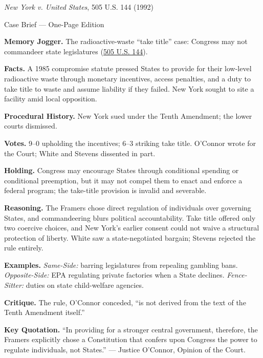 \documentclass[12pt]{article}
\begin{document}
\begin{center}
{\Large \textit{New York v. United States}, 505 U.S. 144 (1992)\par}
\vspace{0.3em}
{\normalsize Case Brief --- One-Page Edition\par}
\end{center}

\textbf{Memory Jogger.} The radioactive-waste ``take title'' case: Congress may not commandeer state legislatures (\href{https://www.courtlistener.com/opinion/112768/new-york-v-united-states/}{505 U.S. 144}).

\textbf{Facts.} A 1985 compromise statute pressed States to provide for their low-level radioactive waste through monetary incentives, access penalties, and a duty to take title to waste and assume liability if they failed. New York sought to site a facility amid local opposition.

\textbf{Procedural History.} New York sued under the Tenth Amendment; the lower courts dismissed.

\textbf{Votes.} 9--0 upholding the incentives; 6--3 striking take title. O'Connor wrote for the Court; White and Stevens dissented in part.

\textbf{Holding.} Congress may encourage States through conditional spending or conditional preemption, but it may not compel them to enact and enforce a federal program; the take-title provision is invalid and severable.

\textbf{Reasoning.} The Framers chose direct regulation of individuals over governing States, and commandeering blurs political accountability. Take title offered only two coercive choices, and New York's earlier consent could not waive a structural protection of liberty. White saw a state-negotiated bargain; Stevens rejected the rule entirely.

\textbf{Examples.} \emph{Same-Side:} barring legislatures from repealing gambling bans. \emph{Opposite-Side:} EPA regulating private factories when a State declines. \emph{Fence-Sitter:} duties on state child-welfare agencies.

\textbf{Critique.} The rule, O'Connor conceded, ``is not derived from the text of the Tenth Amendment itself.''

\textbf{Key Quotation.} ``In providing for a stronger central government, therefore, the Framers explicitly chose a Constitution that confers upon Congress the power to regulate individuals, not States.'' --- Justice O'Connor, Opinion of the Court.
\end{document}
